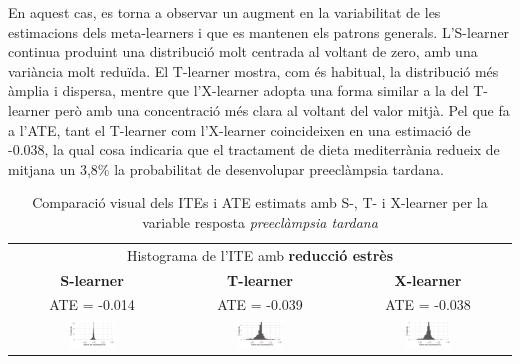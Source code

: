 \documentclass[../main.tex]{subfiles}
\begin{document}
    En aquest cas, es torna a observar un augment en la variabilitat de les estimacions dels meta-learners i que es mantenen els patrons generals. L’S-learner continua produint una distribució molt centrada al voltant de zero, amb una variància molt reduïda. El T-learner mostra, com és habitual, la distribució més àmplia i dispersa, mentre que l’X-learner adopta una forma similar a la del T-learner però amb una concentració més clara al voltant del valor mitjà. Pel que fa a l’ATE, tant el T-learner com l’X-learner coincideixen en una estimació de -0.038, la qual cosa indicaria que el tractament de dieta mediterrània redueix de mitjana un 3,8\% la probabilitat de desenvolupar preeclàmpsia tardana.

    \begin{table}[H]
        \centering
        \begin{tabular}{ccc}
        \multicolumn{3}{c}{Histograma de l'ITE amb \textbf{reducció estrès}} \\
        \small \textbf{S-learner} & \small \textbf{T-learner} & \small \textbf{X-learner} \\
        \footnotesize ATE = -0.014 & \footnotesize ATE = -0.039 & \footnotesize ATE = -0.038 \\
        \includegraphics[width=0.3\textwidth]{imgs/histogrames/hist(PElate)S_tract3.jpg} &
        \includegraphics[width=0.3\textwidth]{imgs/histogrames/hist(PElate)T_tract3.jpg} &
        \includegraphics[width=0.3\textwidth]{imgs/histogrames/hist(PElate)X_tract3.jpg} \\
        \end{tabular}
        \caption{\footnotesize Comparació visual dels ITEs i ATE estimats amb S-, T- i X-learner per la variable resposta \textit{preeclàmpsia tardana}}
        \label{tab:histITE_PElate3}
    \end{table}
\end{document}
